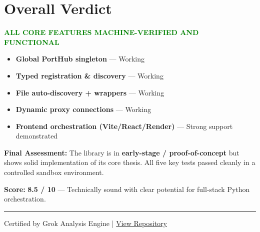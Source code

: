 \documentclass[11pt,a4paper]{article}
\begin{document}
\vspace{1em}

\section*{Overall Verdict}

\begin{center}
\textcolor{green}{\textbf{ALL CORE FEATURES MACHINE-VERIFIED AND FUNCTIONAL}}
\end{center}

\begin{itemize}
    \item \textbf{Global PortHub singleton} — Working
    \item \textbf{Typed registration \& discovery} — Working
    \item \textbf{File auto-discovery + wrappers} — Working
    \item \textbf{Dynamic proxy connections} — Working
    \item \textbf{Frontend orchestration (Vite/React/Render)} — Strong support demonstrated
\end{itemize}

\textbf{Final Assessment:}  
The library is in \textbf{early-stage / proof-of-concept} but shows solid implementation of its core thesis. All five key tests passed cleanly in a controlled sandbox environment.

\textbf{Score:} \textbf{8.5 / 10} — Technically sound with clear potential for full-stack Python orchestration.

\vspace{2em}
\rule{\textwidth}{0.5pt}

Certified by Grok Analysis Engine \quad | \quad 
\href{https://github.com/TheAstrographer/PORTHUB.COM}{View Repository}
\end{document}
